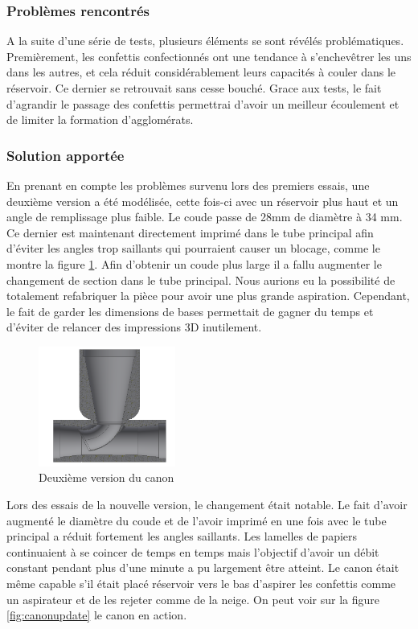 \subsubsection{Problèmes rencontrés}

A la suite d'une série de tests, plusieurs éléments se sont révélés problématiques. Premièrement, les 
confettis confectionnés ont une tendance à s’enchevêtrer les uns dans les autres, et cela réduit 
considérablement leurs capacités à couler dans le réservoir. Ce dernier se retrouvait sans cesse 
bouché. Grace aux tests, le fait d’agrandir le passage des confettis permettrai d’avoir un meilleur 
écoulement et de limiter la formation d'agglomérats.

\subsubsection{Solution apportée}

En prenant en compte les problèmes survenu lors des premiers essais, une deuxième version a été modélisée, 
cette fois-ci avec un réservoir plus haut et un angle de remplissage plus faible. Le coude passe 
de 28mm de diamètre à 34 mm. Ce dernier est maintenant directement imprimé dans le tube principal afin 
d’éviter les angles trop saillants qui pourraient causer un blocage, comme le montre la figure \ref{fig:venturiv2}. 
Afin d’obtenir un coude plus large 
il a fallu augmenter le changement de section dans le tube principal. Nous aurions eu la possibilité de 
totalement refabriquer la pièce pour avoir une plus grande aspiration. Cependant, le fait de garder 
les dimensions de bases permettait de gagner du temps et d’éviter de relancer des impressions 3D inutilement.

\begin{figure}[H]
    \centering
    \includegraphics[width=0.4\textwidth]{Images/photos_PGA/venturi_v2.PNG}
    \caption{Deuxième version du canon}
    \label{fig:venturiv2}
\end{figure}

Lors des essais de la nouvelle version, le changement était notable. Le fait d’avoir augmenté le diamètre 
du coude et de l’avoir imprimé en une fois avec le tube principal a réduit fortement les angles saillants. 
Les lamelles de papiers continuaient à se coincer de temps en temps mais l’objectif d’avoir un débit 
constant pendant plus d'une minute a pu largement être atteint. Le canon était même capable s’il était 
placé réservoir vers le bas d’aspirer les confettis comme un aspirateur et de les rejeter comme de la 
neige. On peut voir sur la figure \ref{fig:canonupdate} le canon en action.

